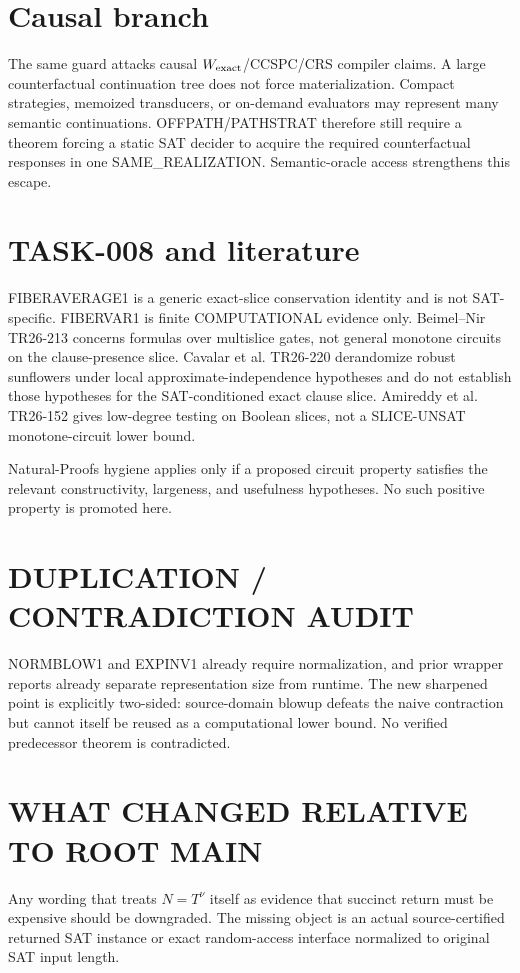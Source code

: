 \documentclass[11pt]{article}
\begin{document}
\section*{Causal branch}
The same guard attacks causal \(W_{\rm exact}\)/CCSPC/CRS compiler claims. A large counterfactual continuation tree does not force materialization. Compact strategies, memoized transducers, or on-demand evaluators may represent many semantic continuations. OFFPATH/PATHSTRAT therefore still require a theorem forcing a static SAT decider to acquire the required counterfactual responses in one SAME\_REALIZATION. Semantic-oracle access strengthens this escape.

\section*{TASK-008 and literature}
FIBERAVERAGE1 is a generic exact-slice conservation identity and is not SAT-specific. FIBERVAR1 is finite COMPUTATIONAL evidence only. Beimel--Nir TR26-213 concerns formulas over multislice gates, not general monotone circuits on the clause-presence slice. Cavalar et al. TR26-220 derandomize robust sunflowers under local approximate-independence hypotheses and do not establish those hypotheses for the SAT-conditioned exact clause slice. Amireddy et al. TR26-152 gives low-degree testing on Boolean slices, not a SLICE-UNSAT monotone-circuit lower bound.

Natural-Proofs hygiene applies only if a proposed circuit property satisfies the relevant constructivity, largeness, and usefulness hypotheses. No such positive property is promoted here.

\section*{DUPLICATION / CONTRADICTION AUDIT}
NORMBLOW1 and EXPINV1 already require normalization, and prior wrapper reports already separate representation size from runtime. The new sharpened point is explicitly two-sided: source-domain blowup defeats the naive contraction but cannot itself be reused as a computational lower bound. No verified predecessor theorem is contradicted.

\section*{WHAT CHANGED RELATIVE TO ROOT MAIN}
Any wording that treats \(N=T^\nu\) itself as evidence that succinct return must be expensive should be downgraded. The missing object is an actual source-certified returned SAT instance or exact random-access interface normalized to original SAT input length.
\end{document}
